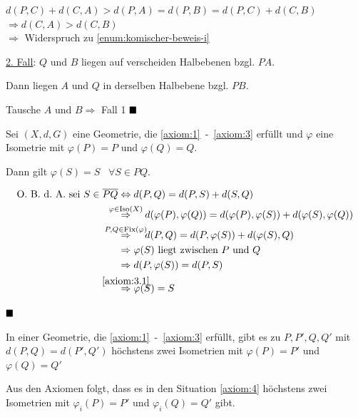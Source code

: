 \begin{beweis}
\begin{enumerate}[label=(\roman*)]
\begin{enumerate}[label=\alph*)]
                      $d(P,C) + d(C,A) > d(P,A) = d(P,B) = d(P,C) + d(C, B)$\\
                      $\Rightarrow d(C, A) > d(C, B)$\\
                      $\Rightarrow$ Widerspruch zu \cref{enum:komischer-beweis-i}
            \end{enumerate}
    \end{enumerate}

    \underline{2. Fall}: $Q$ und $B$ liegen auf verscheiden Halbebenen bzgl. $PA$.

    Dann liegen $A$ und $Q$ in derselben Halbebene bzgl. $PB$.

    Tausche $A$ und $B \Rightarrow$  Fall 1 $\qed$
\end{beweis}

\begin{bemerkung}\label{kor:beh2'}
    Sei $(X, d, G)$ eine Geometrie, die \ref{axiom:1}~-~\ref{axiom:3}
    erfüllt und $\varphi$ eine Isometrie mit $\varphi(P) = P$ und $\varphi(Q) = Q$.

    Dann gilt $\varphi(S) = S\;\;\;\forall S \in PQ$.
\end{bemerkung}

\begin{beweis}
    \begin{align*}
        \text{\Obda sei } S \in \overline{PQ} &\Leftrightarrow d(P,Q) = d(P,S) + d(S,Q)\\
        &\overset{\mathclap{\varphi \in \Iso(X)}}{\Rightarrow}\hspace{4 mm} d(\varphi(P),\varphi(Q)) = d(\varphi(P),\varphi(S)) + d(\varphi(S),\varphi(Q))\\
        &\overset{\mathclap{P, Q \in \Fix(\varphi)}}{\Rightarrow}\hspace{4 mm} d(P, Q) = d(P,\varphi(S)) + d(\varphi(S), Q)\\
        &\Rightarrow \varphi(S) \text{ liegt zwischen } P \text{ und } Q\\
        &\Rightarrow d(P, \varphi(S)) = d(P,S)\\
        &\overset{\mathclap{\ref{axiom:3.1}}}{\Rightarrow} \varphi(S) = S
    \end{align*}

    $\qed$ 
\end{beweis}

\begin{proposition}%
    In einer Geometrie, die \ref{axiom:1}~-~\ref{axiom:3} erfüllt,
    gibt es zu $P, P', Q, Q'$ mit $d(P, Q) = d(P', Q')$ höchstens
    zwei Isometrien mit $\varphi(P) = P'$ und $\varphi(Q) = Q'$

    Aus den Axiomen  folgt, dass es in 
    den Situation \ref{axiom:4} höchstens zwei Isometrien mit
    $\varphi_i(P) = P'$ und $\varphi_i(Q) = Q'$ gibt.
\end{proposition}


